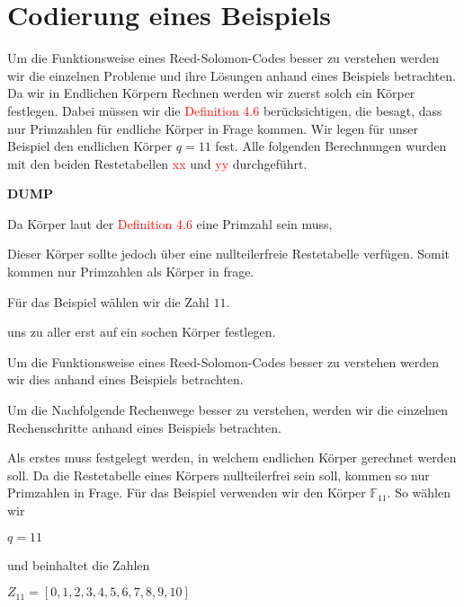 %
%
%
\section{Codierung eines Beispiels
\label{reedsolomon:section:codebsp}}

Um die Funktionsweise eines Reed-Solomon-Codes besser zu verstehen werden wir die einzelnen Probleme und ihre Lösungen anhand eines Beispiels betrachten.
Da wir in Endlichen Körpern Rechnen werden wir zuerst solch ein Körper festlegen. Dabei müssen wir die \textcolor{red}{Definition 4.6} berücksichtigen, die besagt, dass nur Primzahlen für endliche Körper in Frage kommen.
Wir legen für unser Beispiel den endlichen Körper $q = 11$ fest. 
Alle folgenden Berechnungen wurden mit den beiden Restetabellen \textcolor{red}{xx} und \textcolor{red}{yy} durchgeführt.

%
%





\textbf{DUMP}

Da Körper laut der \textcolor{red}{Definition 4.6} eine Primzahl sein muss, 


Dieser Körper sollte jedoch über eine nullteilerfreie Restetabelle verfügen. Somit kommen nur Primzahlen als Körper in frage.


 Für das Beispiel wählen wir die Zahl $11$. 

 uns zu aller erst auf ein sochen Körper festlegen. 

Um die Funktionsweise eines Reed-Solomon-Codes besser zu verstehen werden wir dies anhand eines Beispiels betrachten. 

Um die Nachfolgende Rechenwege besser zu verstehen, werden wir die einzelnen Rechenschritte anhand eines Beispiels betrachten.




Als erstes muss festgelegt werden, in welchem endlichen Körper gerechnet werden soll.
Da die Restetabelle eines Körpers nullteilerfrei sein soll, kommen so nur Primzahlen in Frage. 
Für das Beispiel verwenden wir den Körper $\mathbb{F}_{11}$. So wählen wir 


$q = 11$ 


und beinhaltet die Zahlen 


$Z_{11} = [0, 1, 2, 3, 4, 5, 6, 7, 8, 9, 10]$

